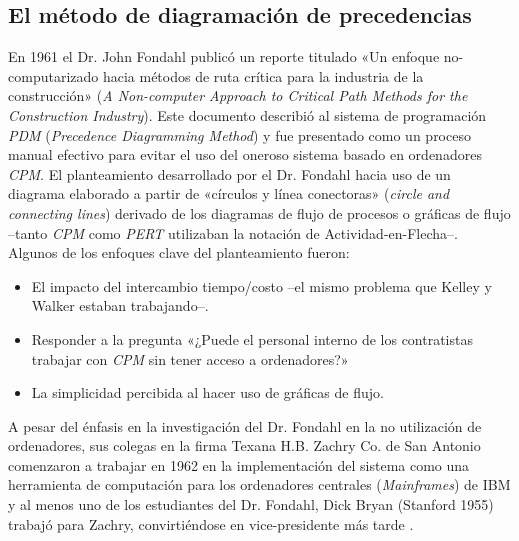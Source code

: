 \documentclass[spanish,draft,12pt,headsepline,footsepline,paper=letter]{scrreprt}
\begin{document}

\subsection{El método de diagramación de precedencias} %
\label{sub:metodo_programacion_precedencia}

En 1961 el Dr. John Fondahl publicó un reporte titulado «Un enfoque no-computarizado hacia métodos de ruta crítica para la industria de la construcción» (\textit{A Non-computer Approach to Critical Path Methods for the Construction Industry}). Este documento describió al sistema de programación \textit{PDM} (\textit{Precedence Diagramming Method}) y fue presentado como un proceso manual efectivo para evitar el uso del oneroso sistema basado en ordenadores \textit{CPM}.
%
El planteamiento desarrollado por el Dr. Fondahl hacia uso de un diagrama elaborado a partir de «círculos y línea conectoras» (\textit{circle and connecting lines}) derivado de los diagramas de flujo de procesos o gráficas de flujo –tanto \textit{CPM} como \textit{PERT} utilizaban la notación de Actividad-en-Flecha–. Algunos de los enfoques clave del planteamiento fueron:

\begin{itemize}
\item El impacto del intercambio tiempo/costo –el mismo problema que Kelley y Walker estaban trabajando–.
\item Responder a la pregunta «¿Puede el personal interno de los contratistas trabajar con \textit{CPM} sin tener acceso a ordenadores?»
\item La simplicidad percibida al hacer uso de gráficas de flujo.
\end{itemize}

A pesar del énfasis en la investigación del Dr. Fondahl en la no utilización de ordenadores, sus colegas en la firma Texana H.B. Zachry Co. de San Antonio comenzaron a trabajar en 1962 en la implementación del sistema como una herramienta de computación para los ordenadores centrales (\textit{Mainframes}) de IBM y al menos uno de los estudiantes del Dr. Fondahl, Dick Bryan (Stanford 1955) trabajó para Zachry, convirtiéndose en vice-presidente más tarde \citep[p.~9]{Weaver2006}.
\end{document}
